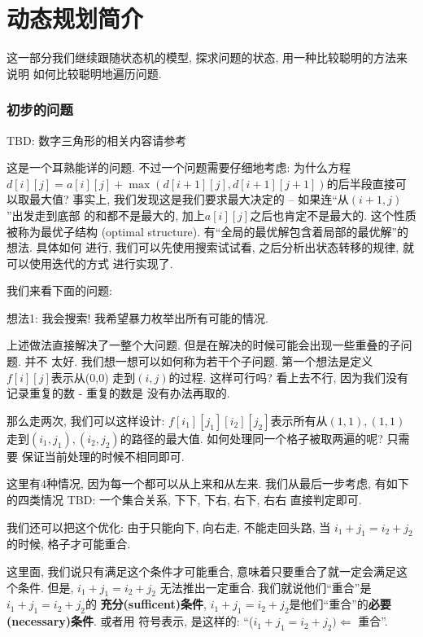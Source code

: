 \part{动态规划简介}

这一部分我们继续跟随状态机的模型, 探求问题的状态, 用一种比较聪明的方法来说明
如何比较聪明地遍历问题. 

\section{初步的问题}

 TBD: 数字三角形的相关内容请参考

这是一个耳熟能详的问题. 不过一个问题需要仔细地考虑: 为什么方程
$d[i][j]=a[i][j]+\max(d[i+1][j], d[i+1][j+1])$的后半段直接可以取最大值? 
事实上, 我们发现这是我们要求最大决定的 -- 如果连``从$(i+1,j)$''出发走到底部
的和都不是最大的, 加上$a[i][j]$之后也肯定不是最大的. 这个性质被称为最优子结构
(optimal structure). 有``全局的最优解包含着局部的最优解''的想法. 具体如何
进行, 我们可以先使用搜索试试看, 之后分析出状态转移的规律, 就可以使用迭代的方式
进行实现了. 

我们来看下面的问题: 

 想法1: 我会搜索! 我希望暴力枚举出所有可能的情况. 

上述做法直接解决了一整个大问题. 但是在解决的时候可能会出现一些重叠的子问题. 并不
太好. 我们想一想可以如何称为若干个子问题. 第一个想法是定义$f[i][j]$表示从(0,0)
走到$(i,j)$的过程. 这样可行吗? 看上去不行, 因为我们没有记录重复的数 - 重复的数是
没有办法再取的. 

那么走两次, 我们可以这样设计: $f[i_1][j_1][i_2][j_2]$表示所有从$(1,1),(1,1)$
走到$(i_1,j_1),(i_2,j_2)$的路径的最大值. 如何处理同一个格子被取两遍的呢? 只需要
保证当前处理的时候不相同即可. 

这里有4种情况, 因为每一个都可以从上来和从左来. 我们从最后一步考虑, 有如下的四类情况
TBD: 一个集合关系, 下下, 下右, 右下, 右右 直接判定即可. 

我们还可以把这个优化: 由于只能向下, 向右走, 不能走回头路, 当
$i_1+j_1 = i_2 +j_2$的时候, 格子才可能重合. 

 这里面, 我们说只有满足这个条件才可能重合, 
意味着只要重合了就一定会满足这个条件. 但是, $i_1+j_1 = i_2 +j_2$
无法推出一定重合. 我们就说他们``重合''是$i_1+j_1 = i_2 +j_2$的
\textbf{充分(sufficent)条件}, 
$i_1+j_1 = i_2 +j_2$是他们``重合''的\textbf{必要(necessary)条件}. 或者用
符号表示, 是这样的: ``($i_1+j_1 = i_2 +j_2)\Leftarrow$ 重合''. 

